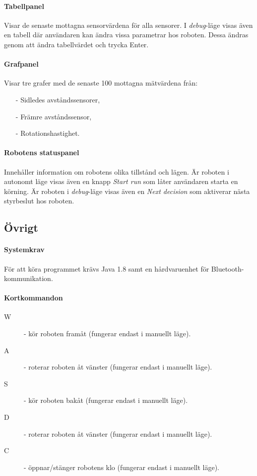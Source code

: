 \documentclass[11pt]{article}
\begin{document}
\paragraph{Tabellpanel} Visar de senaste mottagna sensorvärdena för alla sensorer. I \textit{debug}-läge visas även en tabell där användaren kan ändra vissa parametrar hos roboten. Dessa ändras genom att ändra tabellvärdet och trycka Enter.

\paragraph{Grafpanel}
Visar tre grafer med  de senaste 100 mottagna mätvärdena från:
\begin{itemize}
  \item[-] Sidledes avståndssensorer,
  \item[-] Främre avståndssensor,
  \item[-] Rotationshastighet.
\end{itemize}

\paragraph{Robotens statuspanel}
Innehåller information om robotens olika tillstånd och lägen. Är roboten i autonomt läge visas även en knapp \emph{Start run} som låter användaren starta en körning. Är roboten i \textit{debug}-läge visas även en \emph{Next decision} som aktiverar nästa styrbeslut hos roboten. 

\subsection{Övrigt}
\label{shortcuts}
\paragraph{Systemkrav} För att köra programmet krävs Java 1.8 samt en hårdvaruenhet för Bluetooth\textsuperscript{\circledR}-kommunikation.
\paragraph{Kortkommandon}\label{kortkommandon}
\begin{description}
	\item[W] - kör roboten framåt (fungerar endast i manuellt läge).
	\item[A] - roterar roboten åt vänster (fungerar endast i manuellt läge).
	\item[S] - kör roboten bakåt (fungerar endast i manuellt läge).
	\item[D] - roterar roboten åt vänster (fungerar endast i manuellt läge).
	\item[C] - öppnar/stänger robotens klo (fungerar endast i manuellt läge).
\end{description}
\end{document}
